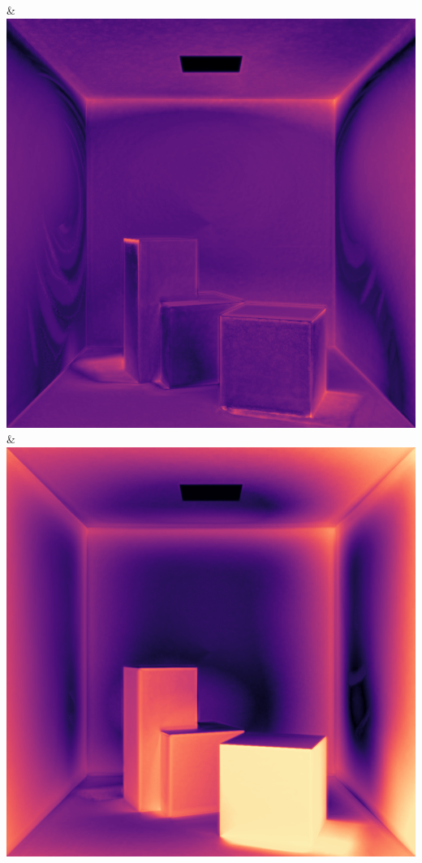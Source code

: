 & \includegraphics[width=\linewidth]{figures/py/tests/quality_comparison/nrc+pt_1min_flip.png}
& \includegraphics[width=\linewidth]{figures/py/tests/quality_comparison/nrc+pt+sl_1min_flip.png}
